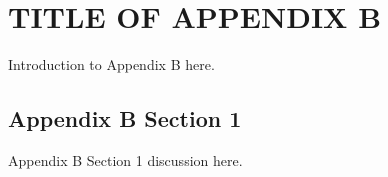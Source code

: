 \chapter{TITLE OF APPENDIX B}
Introduction to Appendix B here.

\section{Appendix B Section 1}

Appendix B Section 1 discussion here.